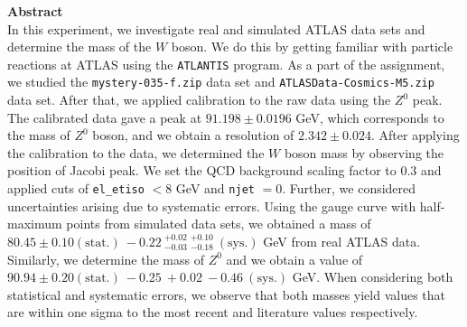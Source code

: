 \documentclass[a4paper]{report}
\numberwithin{equation}{section}
\begin{document}
\begin{titlepage}
	\vspace*{5em}

	\begin{minipage}{0.8\textwidth}
		\begin{centering}
			\textbf{Abstract}\\[0.2cm]
            In this experiment, we investigate real and simulated ATLAS data sets and determine the mass of the $W$ boson. We do this by getting familiar with particle reactions at ATLAS using the \texttt{ATLANTIS} program. As a part of the assignment, we studied the \texttt{mystery-035-f.zip} data set and \texttt{ATLASData-Cosmics-M5.zip} data set. After that, we applied calibration to the raw data using the $Z^0$ peak. The calibrated data gave a peak at $91.198 \pm 0.0196$ GeV, which corresponds to the mass of $Z^0$ boson, and we obtain a resolution of $2.342 \pm 0.024$. After applying the calibration to the data, we determined the $W$ boson mass by observing the position of Jacobi peak. We set the QCD background scaling factor to 0.3 and applied cuts of \texttt{el\_etiso} $< 8$ GeV and \texttt{njet} $=0$. Further, we considered uncertainties arising due to systematic errors. Using the gauge curve with half-maximum points from simulated data sets, we obtained a mass of $80.45 \pm 0.10 (\mathrm{stat.}) \: -0.22 \: ^{+0.02}_{-0.03} \: ^{+0.10}_{-0.18} \: (\mathrm{sys.})$ GeV from real ATLAS data. Similarly, we determine the mass of $Z^0$ and we obtain a value of $90.94 \pm 0.20 (\mathrm{stat.}) \: -0.25 \: + 0.02 \: -0.46 \: (\mathrm{sys.})$ GeV. 
            When considering both statistical and systematic errors, we observe that both masses yield values that are within one sigma to the most recent and literature values respectively. 
		\end{centering}
	\end{minipage}
	
	
	
	
	
	
	 
	
	
\end{titlepage}
\end{document}
